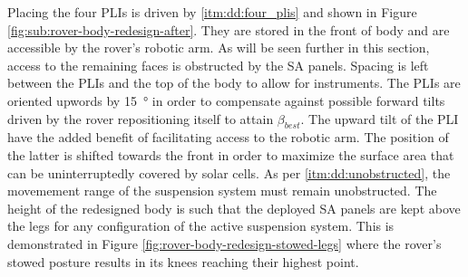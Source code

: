 Placing the four \acp{PLI} is driven by \ref{itm:dd:four_plis} and shown in Figure \ref{fig:sub:rover-body-redesign-after}. They are stored in the front of body and are accessible by the rover's robotic arm. As will be seen further in this section, access to the remaining faces is obstructed by the \ac{SA} panels. Spacing is left between the \acp{PLI} and the top of the body to allow for instruments. The \acp{PLI} are oriented upwords by \SI{15}{\degree} in order to compensate against possible forward tilts driven by the rover repositioning itself to attain $\beta_{best}$. The upward tilt of the \ac{PLI} have the added benefit of facilitating access to the robotic arm. The position of the latter is shifted towards the front in order to maximize the surface area that can be uninterruptedly covered by solar cells. As per \ref{itm:dd:unobstructed}, the movemement range of the suspension system must remain unobstructed. The height of the redesigned body is such that the deployed \ac{SA} panels are kept above the legs for any configuration of the active suspension system. This is demonstrated in Figure \ref{fig:rover-body-redesign-stowed-legs} where the rover's stowed posture results in its knees reaching their highest point.


